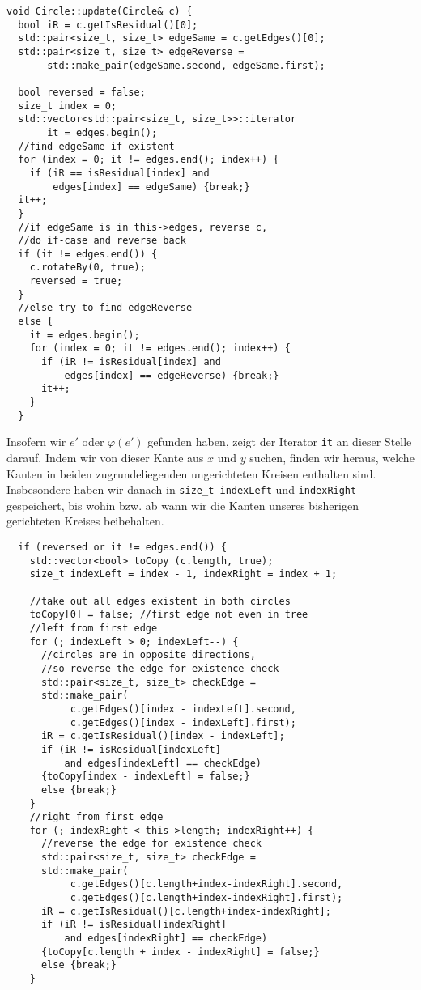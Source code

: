\begin{lstlisting}
void Circle::update(Circle& c) {
  bool iR = c.getIsResidual()[0];
  std::pair<size_t, size_t> edgeSame = c.getEdges()[0];
  std::pair<size_t, size_t> edgeReverse =
       std::make_pair(edgeSame.second, edgeSame.first);

  bool reversed = false;
  size_t index = 0;
  std::vector<std::pair<size_t, size_t>>::iterator
       it = edges.begin();
  //find edgeSame if existent
  for (index = 0; it != edges.end(); index++) {
    if (iR == isResidual[index] and
        edges[index] == edgeSame) {break;}
  it++;
  }
  //if edgeSame is in this->edges, reverse c,
  //do if-case and reverse back
  if (it != edges.end()) {
    c.rotateBy(0, true);
    reversed = true;
  }
  //else try to find edgeReverse
  else {
    it = edges.begin();
    for (index = 0; it != edges.end(); index++) {
      if (iR != isResidual[index] and 
          edges[index] == edgeReverse) {break;}
      it++;
    }
  }
\end{lstlisting}

Insofern wir $e'$ oder $\varphi(e')$ gefunden haben, zeigt der Iterator \lstinline|it| an dieser Stelle darauf. Indem wir von dieser Kante aus $x$ und $y$ suchen, finden wir heraus, welche Kanten in beiden zugrundeliegenden ungerichteten Kreisen enthalten sind. Insbesondere haben wir danach in \lstinline|size_t indexLeft| und \lstinline|indexRight| gespeichert, bis wohin bzw. ab wann wir die Kanten unseres bisherigen gerichteten Kreises beibehalten.

\begin{lstlisting}
  if (reversed or it != edges.end()) {
    std::vector<bool> toCopy (c.length, true);
    size_t indexLeft = index - 1, indexRight = index + 1;
    
    //take out all edges existent in both circles
    toCopy[0] = false; //first edge not even in tree
    //left from first edge
    for (; indexLeft > 0; indexLeft--) {
      //circles are in opposite directions,
      //so reverse the edge for existence check
      std::pair<size_t, size_t> checkEdge =
      std::make_pair(
           c.getEdges()[index - indexLeft].second,
           c.getEdges()[index - indexLeft].first);
      iR = c.getIsResidual()[index - indexLeft];
      if (iR != isResidual[indexLeft] 
          and edges[indexLeft] == checkEdge)
      {toCopy[index - indexLeft] = false;}
      else {break;}
    }
    //right from first edge
    for (; indexRight < this->length; indexRight++) {
      //reverse the edge for existence check
      std::pair<size_t, size_t> checkEdge =
      std::make_pair(
           c.getEdges()[c.length+index-indexRight].second,
           c.getEdges()[c.length+index-indexRight].first);
      iR = c.getIsResidual()[c.length+index-indexRight];
      if (iR != isResidual[indexRight]
          and edges[indexRight] == checkEdge)
      {toCopy[c.length + index - indexRight] = false;}
      else {break;}
    }
\end{lstlisting}

